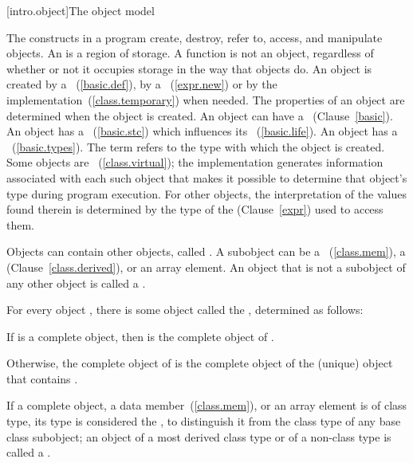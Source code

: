[intro.object]{The \Cpp object model}

\pnum
{}%
%
The constructs in a \Cpp program create, destroy, refer to, access, and
manipulate objects. An  is a region of storage.
\enternote A function is not an object, regardless of whether or not it
occupies storage in the way that objects do. \exitnote An object is
created by a ~(\ref{basic.def}), by a
~(\ref{expr.new}) or by the
implementation~(\ref{class.temporary}) when needed. The properties of an
object are determined when the object is created. An object can have a
~(Clause~\ref{basic}). An object has a ~(\ref{basic.stc}) which influences its
~(\ref{basic.life}). An object has a
~(\ref{basic.types}). The term  refers to
the type with which the object is created.
Some objects are
~(\ref{class.virtual}); the implementation
generates information associated with each such object that makes it
possible to determine that object's type during program execution. For
other objects, the interpretation of the values found therein is
determined by the type of the  (Clause~\ref{expr})
used to access them.

\pnum
{}%
Objects can contain other objects, called .
A subobject can be
a ~(\ref{class.mem}), a 
(Clause~\ref{class.derived}), or an array element.
%
An object that is not a subobject of any other object is called a .

\pnum
For every object , there is some object called the
 , determined as follows:

\begin{compactitem}

\item
If  is a complete object, then  is the complete
object of .

\item
Otherwise, the complete object of  is the complete object
of the (unique) object that contains .

\end{compactitem}

\pnum
If a complete object, a data member~(\ref{class.mem}), or an array element is of
class type, its type is considered the , to distinguish it from the class type of any base class subobject;
an object of a most derived class type or of a non-class type is called a
.

